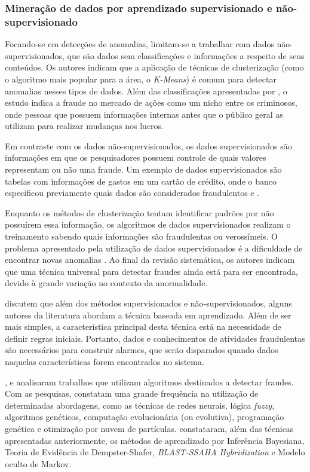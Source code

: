 \documentclass[smallextended]{svjour3}
\begin{document}
\subsubsection{Mineração de dados por aprendizado supervisionado e não-supervisionado}

Focando-se em detecções de anomalias, \cite{Ahmed2015} limitam-se a trabalhar com dados não-supervisionados, que são dados sem classificações e informações a respeito de seus conteúdos. Os autores indicam que a aplicação de técnicas de clusterização (como o algoritmo mais popular para a área, o \emph{K-Means}) é comum para detectar anomalias nesses tipos de dados. Além das classificações apresentadas por \cite{Abdallah2016}, o estudo indica a fraude no mercado de ações como um nicho entre os criminosos, onde pessoas que possuem informações internas antes que o público geral as utilizam para realizar mudanças nos lucros. 

Em contraste com os dados não-supervisionados, os dados supervisionados são informações em que os pesquisadores possuem controle de quais valores representam ou não uma fraude. Um exemplo de dados supervisionados são tabelas com informações de gastos em um cartão de crédito, onde o banco especificou previamente quais dados são considerados fraudulentos \citep{Akoglu2015} e \citep{Branco2016}. 

Enquanto os métodos de clusterização tentam identificar padrões por não possuírem essa informação, os algoritmos de dados supervisionados realizam o treinamento sabendo quais informações são fraudulentas ou verossímeis. O problema apresentado pela utilização de dados supervisionados é a dificuldade de encontrar novas anomalias \citep{Ahmed2015}. Ao final da revisão sistemática, os autores indicam que uma técnica universal para detectar fraudes ainda está para ser encontrada, devido à grande variação no contexto da anormalidade.

\cite{Rebahi2011} discutem que além dos métodos supervisionados e não-supervisionados, alguns autores da literatura abordam a técnica baseada em aprendizado. Além de ser mais simples, a característica principal desta técnica está na necessidade de definir regras iniciais. Portanto, dados e conhecimentos de atividades fraudulentas são necessários para construir alarmes, que serão disparados quando dados naquelas características forem encontrados no sistema.

\cite{Pejic-Bach2010}, \cite{Wang2010} e \cite{Raj2011} analisaram trabalhos que utilizam algoritmos destinados a detectar fraudes. Com as pesquisas, constatam uma grande frequência na utilização de determinadas abordagens, como as técnicas de redes neurais, lógica \emph{fuzzy}, algoritmos genéticos, computação evolucionária (ou evolutiva), programação genética e otimização por nuvem de partículas. \cite{Raj2011} constataram, além das técnicas apresentadas anteriormente, os métodos de aprendizado por Inferência Bayesiana, Teoria de Evidência de Dempster-Shafer, \emph{BLAST-SSAHA Hybridization} e Modelo oculto de Markov.
\end{document}
